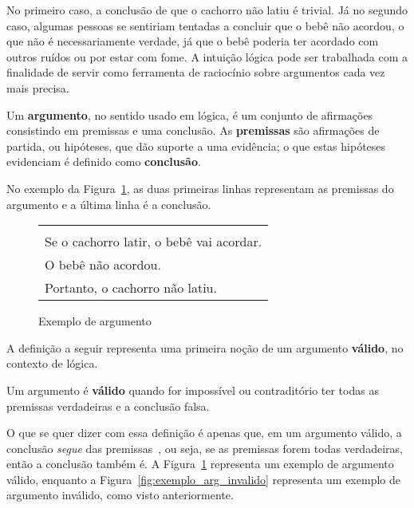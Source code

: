 No primeiro caso, a conclusão de que o cachorro não latiu é trivial. Já no
segundo caso, algumas pessoas se sentiriam tentadas a concluir que o bebê não
acordou, o que não é necessariamente verdade, já que o bebê poderia ter acordado
com outros ruídos ou por estar com fome. A intuição lógica pode ser trabalhada
com a finalidade de servir como ferramenta de raciocínio sobre argumentos cada
vez mais precisa.

\begin{definition}
   Um \textbf{argumento}, no sentido usado em lógica, é um conjunto de
   afirmações consistindo em premissas e uma conclusão. As \textbf{premissas}
   são afirmações de partida, ou hipóteses, que dão suporte a uma evidência; o
   que estas hipóteses evidenciam é definido como \textbf{conclusão}.
\end{definition}

No exemplo da Figura~\ref{fig:exemplo_arg}, as duas primeiras linhas representam
as premissas do argumento e a última linha é a conclusão.

\begin{figure}[!tbh]
\label{fig:exemplo_arg}
    \centering
    {
        \begin{tabular}{|l|}
            \hline \\
            Se o cachorro latir, o bebê vai acordar. \\
            O bebê não acordou.\\
            Portanto, o cachorro não latiu.\\
            \hline
        \end{tabular}
    }
    \caption{Exemplo de argumento}
\end{figure}

A definição a seguir representa uma primeira noção de um argumento
\textbf{válido}, no contexto de lógica.

\begin{definition}
   Um argumento é \textbf{válido} quando for impossível ou contraditório ter
   todas as premissas verdadeiras e a conclusão falsa.
\end{definition}

O que se quer dizer com essa definição é apenas que, em um argumento válido, a
conclusão \textit{segue} das premissas~\cite{gensler}, ou seja, se as premissas
forem todas verdadeiras, então a conclusão também é.
A Figura~\ref{fig:exemplo_arg} representa um exemplo de argumento válido,
enquanto a Figura~\ref{fig:exemplo_arg_invalido} representa um exemplo de
argumento inválido, como visto anteriormente.

